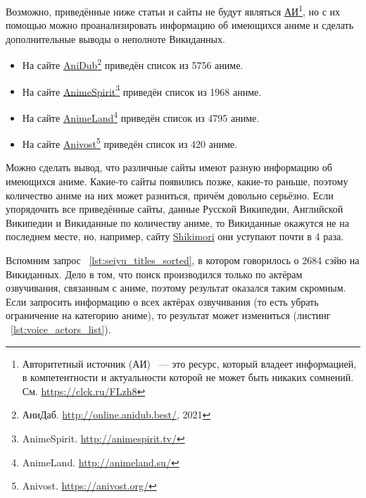 Возможно, приведённые ниже статьи и сайты не будут являться \href{https://clck.ru/FLzh8}{АИ}\footnote{Авторитетный источник (АИ) ~--- это ресурс, который владеет информацией, в компетентности и актуальности которой не может быть никаких сомнений. См. \href{https://clck.ru/FLzh8}{https://clck.ru/FLzh8}}, но с их помощью можно проанализировать информацию об имеющихся аниме и сделать дополнительные выводы о неполноте Викиданных.

\begin{itemize}
	\item На сайте \href{http://online.anidub.best/}{AniDub}\footnote{АниДаб. \href{http://online.anidub.best/}{http://online.anidub.best/}, 2021} приведён список из \num{5756} аниме.
	\item На сайте \href{http://animespirit.tv/}{AnimeSpirit}\footnote{AnimeSpirit. \href{http://animespirit.tv/}{http://animespirit.tv/}} приведён список из \num{1968} аниме.
	\item На сайте \href{http://animeland.su/}{AnimeLand}\footnote{AnimeLand. \href{http://animeland.su/}{http://animeland.su/}} приведён список из \num{4795} аниме.
	\item На сайте \href{https://anivost.org/}{Anivost}\footnote{Anivost. \href{https://anivost.org/}{https://anivost.org/}} приведён список из \num{420} аниме.
\end{itemize}

Можно сделать вывод, что различные сайты имеют разную информацию об имеющихся аниме. Какие-то сайты появились позже, какие-то раньше, поэтому количество аниме на них может разниться, причём довольно серьёзно. Если упорядочить все приведённые сайты, данные Русской Википедии, Английской Википедии и Викиданные по количеству аниме, то Викиданные окажутся не на последнем месте, но, например, сайту \href{https://shikimori.one/}{Shikimori}\cite{shikimori} они уступают почти в 4 раза.

Вспомним запрос ~\protect\ref{lst:seiyu_titles_sorted}, в котором говорилось о \num{2684} сэйю на Викиданных. Дело в том, что поиск производился только по актёрам озвучивания, связанным с аниме, поэтому результат оказался таким скромным. Если запросить информацию о всех актёрах озвучивания (то есть убрать ограничение на категорию аниме), то результат может измениться (листинг ~\protect\ref{lst:voice_actors_list}). 

